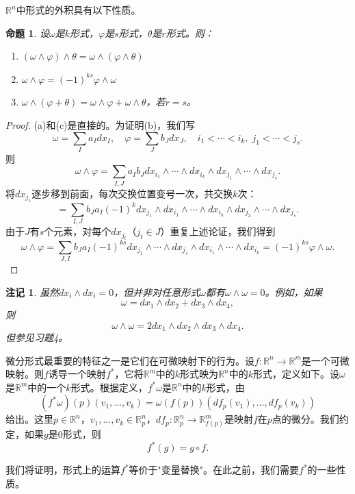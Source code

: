 \documentclass[12pt,a4paper]{ctexbook}
\newtheorem{proposition}[theorem]{命题}
\newtheorem{remark}[theorem]{注记}
\begin{document}
$\mathbb{R}^n$中形式的外积具有以下性质。

\begin{proposition}
设$\omega$是$k$形式，$\varphi$是$s$形式，$\theta$是$r$形式。则：
\begin{enumerate}[label=\alph*)]
    \item $(\omega\wedge\varphi)\wedge\theta = \omega\wedge(\varphi\wedge\theta)$
    \item $\omega\wedge\varphi = (-1)^{ks}\varphi\wedge\omega$
    \item $\omega\wedge(\varphi+\theta) = \omega\wedge\varphi + \omega\wedge\theta$，若$r=s$。
\end{enumerate}
\end{proposition}

\begin{proof}
(a)和(c)是直接的。为证明(b)，我们写
$$\omega = \sum_I a_I dx_I,\quad \varphi = \sum_J b_J dx_J,\quad i_1<\cdots<i_k,\; j_1<\cdots<j_s.$$
则
$$\omega\wedge\varphi = \sum_{I,J} a_I b_J dx_{i_1}\wedge\cdots\wedge dx_{i_k}\wedge dx_{j_1}\wedge\cdots\wedge dx_{j_s}.$$
将$dx_{j_1}$逐步移到前面，每次交换位置变号一次，共交换$k$次：
$$= \sum_{I,J} b_J a_I (-1)^k dx_{j_1}\wedge dx_{i_1}\wedge\cdots\wedge dx_{i_k}\wedge dx_{j_2}\wedge\cdots\wedge dx_{j_s}.$$
由于$J$有$s$个元素，对每个$dx_{j_t}$（$j_t\in J$）重复上述论证，我们得到
$$\omega\wedge\varphi = \sum_{J,I} b_J a_I (-1)^{ks} dx_{j_1}\wedge\cdots\wedge dx_{j_s}\wedge dx_{i_1}\wedge\cdots\wedge dx_{i_k} = (-1)^{ks}\varphi\wedge\omega.$$
\end{proof}

\begin{remark}
虽然$dx_i\wedge dx_i=0$，但并非对任意形式$\omega$都有$\omega\wedge\omega=0$。例如，如果
$$\omega = dx_1\wedge dx_2 + dx_3\wedge dx_4,$$
则
$$\omega\wedge\omega = 2dx_1\wedge dx_2\wedge dx_3\wedge dx_4.$$
但参见习题4。
\end{remark}

微分形式最重要的特征之一是它们在可微映射下的行为。设$f:\mathbb{R}^n\to\mathbb{R}^m$是一个可微映射。则$f$诱导一个映射$f^*$，它将$\mathbb{R}^m$中的$k$形式映为$\mathbb{R}^n$中的$k$形式，定义如下。设$\omega$是$\mathbb{R}^m$中的一个$k$形式。根据定义，$f^*\omega$是$\mathbb{R}^n$中的$k$形式，由
$$(f^*\omega)(p)(v_1,\ldots,v_k) = \omega(f(p))(df_p(v_1),\ldots,df_p(v_k))$$
给出。这里$p\in\mathbb{R}^n$，$v_1,\ldots,v_k\in\mathbb{R}_p^n$，$df_p:\mathbb{R}_p^n\to\mathbb{R}_{f(p)}^m$是映射$f$在$p$点的微分。我们约定，如果$g$是0形式，则
$$f^*(g) = g\circ f.$$

我们将证明，形式上的运算$f^*$等价于"变量替换"。在此之前，我们需要$f^*$的一些性质。
\end{document}
